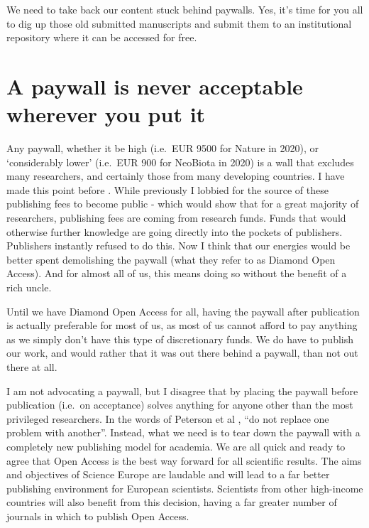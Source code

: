 \documentclass[
]{krantz}
\begin{document}
We need to take back our content stuck behind paywalls. Yes, it's time for you all to dig up those old submitted manuscripts and submit them to an institutional repository where it can be accessed for free.

\hypertarget{a-paywall-is-never-acceptable-wherever-you-put-it}{%
\section{A paywall is never acceptable wherever you put it}\label{a-paywall-is-never-acceptable-wherever-you-put-it}}

Any paywall, whether it be high (i.e.~EUR 9500 for Nature in 2020), or `considerably lower' (i.e.~EUR 900 for NeoBiota in 2020) is a wall that excludes many researchers, and certainly those from many developing countries. I have made this point before \citep{measey2018europe}. While previously I lobbied for the source of these publishing fees to become public - which would show that for a great majority of researchers, publishing fees are coming from research funds. Funds that would otherwise further knowledge are going directly into the pockets of publishers. Publishers instantly refused to do this. Now I think that our energies would be better spent demolishing the paywall (what they refer to as Diamond Open Access). And for almost all of us, this means doing so without the benefit of a rich uncle.

Until we have Diamond Open Access for all, having the paywall after publication is actually preferable for most of us, as most of us cannot afford to pay anything as we simply don't have this type of discretionary funds. We do have to publish our work, and would rather that it was out there behind a paywall, than not out there at all.

I am not advocating a paywall, but I disagree that by placing the paywall before publication (i.e.~on acceptance) solves anything for anyone other than the most privileged researchers. In the words of Peterson et al \citeyearpar{peterson2019open}, ``do not replace one problem with another''. Instead, what we need is to tear down the paywall with a completely new publishing model for academia. We are all quick and ready to agree that Open Access is the best way forward for all scientific results. The aims and objectives of Science Europe are laudable and will lead to a far better publishing environment for European scientists. Scientists from other high-income countries will also benefit from this decision, having a far greater number of journals in which to publish Open Access.
\end{document}
